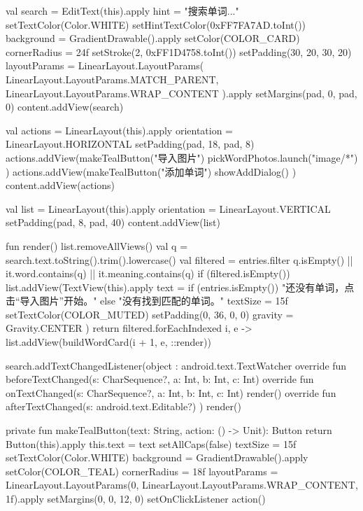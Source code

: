 {{        val search = EditText(this).apply {
            hint = "搜索单词..."
            setTextColor(Color.WHITE)
            setHintTextColor(0xFF7FA7AD.toInt())
            background = GradientDrawable().apply {
                setColor(COLOR_CARD)
                cornerRadius = 24f
                setStroke(2, 0xFF1D4758.toInt())
            }
            setPadding(30, 20, 30, 20)
            layoutParams = LinearLayout.LayoutParams(
                LinearLayout.LayoutParams.MATCH_PARENT,
                LinearLayout.LayoutParams.WRAP_CONTENT
            ).apply { setMargins(pad, 0, pad, 0) }
        }
        content.addView(search)

        val actions = LinearLayout(this).apply {
            orientation = LinearLayout.HORIZONTAL
            setPadding(pad, 18, pad, 8)
        }
        actions.addView(makeTealButton("导入图片") { pickWordPhotos.launch("image/*") })
        actions.addView(makeTealButton("添加单词") { showAddDialog() })
        content.addView(actions)

        val list = LinearLayout(this).apply {
            orientation = LinearLayout.VERTICAL
            setPadding(pad, 8, pad, 40)
        }
        content.addView(list)

        fun render() {
            list.removeAllViews()
            val q = search.text.toString().trim().lowercase()
            val filtered = entries.filter { q.isEmpty() || it.word.contains(q) || it.meaning.contains(q) }
            if (filtered.isEmpty()) {
                list.addView(TextView(this).apply {
                    text = if (entries.isEmpty()) "还没有单词，点击“导入图片”开始。" else "没有找到匹配的单词。"
                    textSize = 15f
                    setTextColor(COLOR_MUTED)
                    setPadding(0, 36, 0, 0)
                    gravity = Gravity.CENTER
                })
                return
            }
            filtered.forEachIndexed { i, e -> list.addView(buildWordCard(i + 1, e, ::render)) }
        }

        search.addTextChangedListener(object : android.text.TextWatcher {
            override fun beforeTextChanged(s: CharSequence?, a: Int, b: Int, c: Int) {}
            override fun onTextChanged(s: CharSequence?, a: Int, b: Int, c: Int) { render() }
            override fun afterTextChanged(s: android.text.Editable?) {}
        })
        render()
    }

    private fun makeTealButton(text: String, action: () -> Unit): Button {
        return Button(this).apply {
            this.text = text
            setAllCaps(false)
            textSize = 15f
            setTextColor(Color.WHITE)
            background = GradientDrawable().apply {
                setColor(COLOR_TEAL)
                cornerRadius = 18f
            }
            layoutParams = LinearLayout.LayoutParams(0, LinearLayout.LayoutParams.WRAP_CONTENT, 1f).apply {
                setMargins(0, 0, 12, 0)
            }
            setOnClickListener { action() }
        }
    }

}
